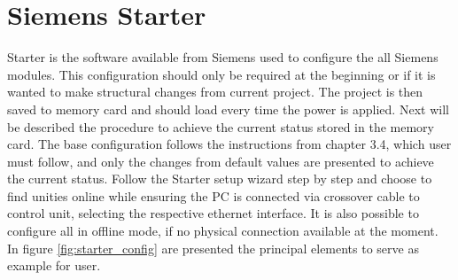 \section{Siemens Starter}

Starter is the software available from Siemens used to configure the all Siemens modules. This configuration should only be required at the beginning or if it is wanted to make structural changes from current project. The project is then saved to memory card and should load every time the power is applied. Next will be described the procedure to achieve the current status stored in the memory card. The base configuration follows the instructions from \cite{siemens_comissioning_manual} chapter 3.4, which user must follow, and only the changes from default values are presented to achieve the current status. Follow the Starter setup wizard step by step and choose to find unities online while ensuring the PC is connected via crossover cable to control unit, selecting the respective ethernet interface. It is also possible to configure all in offline mode, if no physical connection available at the moment.
In figure \ref{fig:starter_config} are presented the principal elements to serve as example for user.


